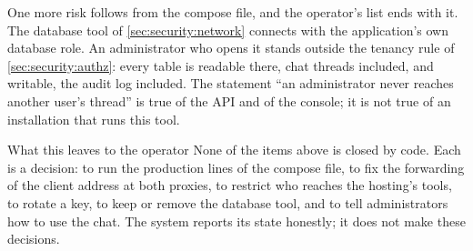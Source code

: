 One more risk follows from the compose file, and the operator's list ends with it. The database
tool of \cref{sec:security:network} connects with the application's own database role. An
administrator who opens it stands outside the tenancy rule of \cref{sec:security:authz}: every
table is readable there, chat threads included, and writable, the audit log included. The
statement \enquote{an administrator never reaches another user's thread} is true of the API
and of the console; it is not true of an installation that runs this tool.

\begin{humanbox}{What this leaves to the operator}
None of the items above is closed by code. Each is a decision: to run the production lines
of the compose file, to fix the forwarding of the client address at both proxies, to restrict
who reaches the hosting's tools, to rotate a key, to keep or remove the
database tool, and to tell administrators how to use the chat. The system reports its state
honestly; it does not make these decisions.
\end{humanbox}
